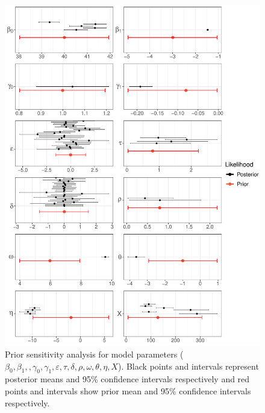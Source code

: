 \documentclass{article}
\begin{document}
\clearpage
\begin{figure}[tbhp] 
\centering
\includegraphics[width=15.5cm]{../../Plots/Supplementary Figure 4.pdf}  
\caption{Prior sensitivity analysis for model parameters ($\beta_0, \beta_1,, 
\gamma_0,\gamma_1,\varepsilon,\tau,\delta,\rho,\omega,\theta,\eta,X$). Black points and intervals represent posterior means and 95\% confidence intervals respectively and red points and intervals show prior mean and 95\% confidence intervals respectively.}
\label{fig:prior_sens}
\end{figure}


\end{document}
